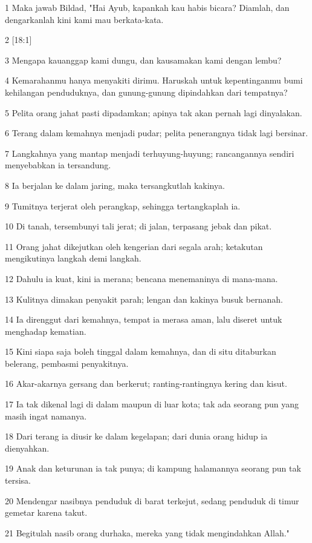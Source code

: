 \par 1 Maka jawab Bildad, "Hai Ayub, kapankah kau habis bicara? Diamlah, dan dengarkanlah kini kami mau berkata-kata.
\par 2 [18:1]
\par 3 Mengapa kauanggap kami dungu, dan kausamakan kami dengan lembu?
\par 4 Kemarahanmu hanya menyakiti dirimu. Haruskah untuk kepentinganmu bumi kehilangan penduduknya, dan gunung-gunung dipindahkan dari tempatnya?
\par 5 Pelita orang jahat pasti dipadamkan; apinya tak akan pernah lagi dinyalakan.
\par 6 Terang dalam kemahnya menjadi pudar; pelita penerangnya tidak lagi bersinar.
\par 7 Langkahnya yang mantap menjadi terhuyung-huyung; rancangannya sendiri menyebabkan ia tersandung.
\par 8 Ia berjalan ke dalam jaring, maka tersangkutlah kakinya.
\par 9 Tumitnya terjerat oleh perangkap, sehingga tertangkaplah ia.
\par 10 Di tanah, tersembunyi tali jerat; di jalan, terpasang jebak dan pikat.
\par 11 Orang jahat dikejutkan oleh kengerian dari segala arah; ketakutan mengikutinya langkah demi langkah.
\par 12 Dahulu ia kuat, kini ia merana; bencana menemaninya di mana-mana.
\par 13 Kulitnya dimakan penyakit parah; lengan dan kakinya busuk bernanah.
\par 14 Ia direnggut dari kemahnya, tempat ia merasa aman, lalu diseret untuk menghadap kematian.
\par 15 Kini siapa saja boleh tinggal dalam kemahnya, dan di situ ditaburkan belerang, pembasmi penyakitnya.
\par 16 Akar-akarnya gersang dan berkerut; ranting-rantingnya kering dan kisut.
\par 17 Ia tak dikenal lagi di dalam maupun di luar kota; tak ada seorang pun yang masih ingat namanya.
\par 18 Dari terang ia diusir ke dalam kegelapan; dari dunia orang hidup ia dienyahkan.
\par 19 Anak dan keturunan ia tak punya; di kampung halamannya seorang pun tak tersisa.
\par 20 Mendengar nasibnya penduduk di barat terkejut, sedang penduduk di timur gemetar karena takut.
\par 21 Begitulah nasib orang durhaka, mereka yang tidak mengindahkan Allah."

